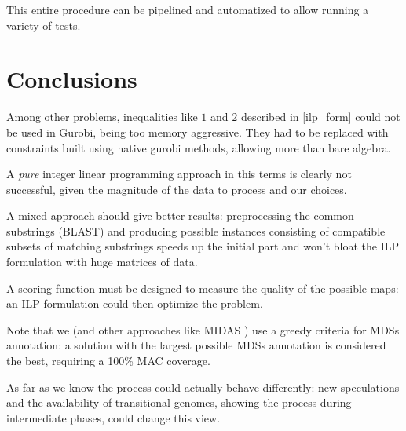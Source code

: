 This entire procedure can be pipelined and automatized to allow running a variety of tests.
\clearpage


\section{Conclusions}
Among other problems, inequalities like $1$ and $2$ described in \ref{ilp_form} could not be used in Gurobi, being too memory aggressive. They had to be replaced with constraints built using native gurobi methods, allowing more than bare algebra.

A \textit{pure} integer linear programming approach in this terms is clearly not successful, given the magnitude of the data to process and our choices.

A mixed approach should give better results: preprocessing the common substrings (BLAST) and producing possible instances consisting of compatible subsets of matching substrings speeds up the initial part and won't bloat the ILP formulation with huge matrices of data.

A scoring function must be designed to measure the quality of the possible maps: an ILP formulation could then optimize the problem.

Note that we (and other approaches like MIDAS \cite{midas}) use a greedy criteria for MDSs annotation: a solution with the largest possible MDSs annotation is considered the best, requiring a 100\% MAC coverage.

As far as we know the process could actually behave differently: new speculations and the availability of transitional genomes, showing the process during intermediate phases, could change this view.